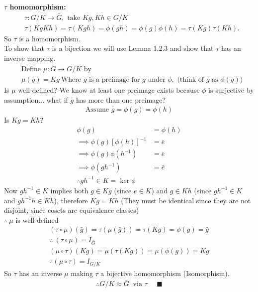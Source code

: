 \begin{theorem}
\textbf{$\tau$ homomorphism:}\\
\begin{align}
    &\tau : G/K \rightarrow \bar{G}, \text{ take } Kg,Kh\in G/K \nonumber \\
    &\tau(KgKh)=\tau(Kgh)=\phi(gh)=\phi(g)\phi(h)= \tau(Kg)\tau(Kh). \nonumber
\end{align} 
So $\tau$ is a homomorphism.\\
To show that $\tau$ is a bijection we will use Lemma 1.2.3 and show that $\tau$ has an inverse mapping. \\
\begin{align}
    &\text{Define }\mu : \bar{G}\rightarrow G/K \text{ by }\nonumber \\
    &\mu(\bar{g})=Kg \ \text{Where }g\text{ is a preimage for }\bar{g} \text{ under }\phi, \text{  (think of $\bar{g}$ as $\phi(g)$)} \nonumber
\end{align}
Is $\mu$ well-defined? We know at least one preimage exists because $\phi$ is surjective by assumption... what if $\bar{g}$ has more than one preimage?
\begin{align}
    \text{Assume } \bar{g}=\phi(g)=\phi(h) \nonumber
\end{align}
Is $Kg=Kh$?
\begin{align}
    \phi(g)&=\phi(h) \nonumber \\
    \implies \phi(g)[\phi(h)]^{-1}&=\bar{e} \nonumber \\
    \implies \phi(g)\phi(h^{-1})&=\bar{e} \nonumber \\
    \implies \phi(gh^{-1})&=\bar{e} \nonumber \\
    \therefore gh^{-1}\in K = \ker\phi \nonumber
\end{align}
Now $gh^{-1} \in K$ implies both $g\in Kg$ (since $e\in K$) and $g\in Kh$ (since $gh^{-1} \in K$ and $gh^{-1}h\in Kh$), therefore $Kg=Kh$ (They must be identical since they are not disjoint, since cosets are equivalence classes)\\
$\therefore \ \mu$ is well-defined 
\begin{align}
    (\tau \circ \mu)(\bar{g})=\tau(\mu(\bar{g}))=\tau(Kg)=\phi(g)=\bar{g} \nonumber \\
    \therefore \ (\tau\circ\mu)= I_{\bar{G}} \nonumber \\
    (\mu \circ \tau)(Kg)=\mu(\tau(Kg))=\mu(\phi(g))=Kg \nonumber \\
    \therefore (\mu\circ\tau)=I_{G/K} \nonumber
\end{align}
So $\tau$ has an inverse $\mu$ making $\tau$ a bijective homomorphism (Isomorphism).
\begin{align}
    \therefore G/K \approx \bar{G} \ \text{ via } \tau \ \ \ \ \ \ \blacksquare \nonumber
\end{align}
\end{theorem}

